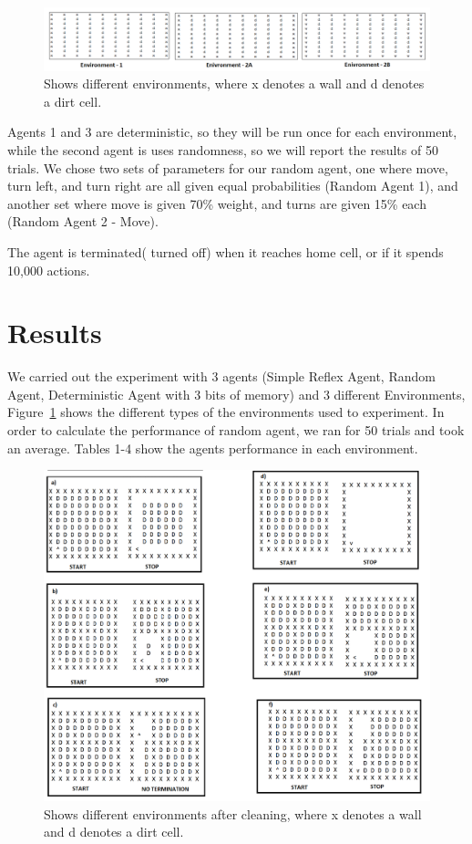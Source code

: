 \documentclass{article}
\begin{document}
\begin{figure}[h!]
\centering
\includegraphics[width=1\linewidth]{different_evirnoments.png}
\caption{Shows different environments, where x denotes a wall and d denotes a dirt cell.}
\label{fig:environments}
\end{figure}

Agents 1 and 3 are deterministic, so they will be run once for each environment, while the second agent is uses randomness, so we will report the results of 50 trials.  We chose two sets of parameters for our random agent, one where move, turn left, and turn right are all given equal probabilities (Random Agent 1), and another set where move is given 70\% weight, and turns are given 15\% each (Random Agent 2 - Move).

The agent is terminated( turned off) when it reaches home cell, or if it spends 10,000 actions.



\section{Results}
We carried out the experiment with 3 agents (Simple Reflex Agent, Random Agent, Deterministic Agent with 3 bits of memory) and 3 different Environments, Figure~\ref{fig:environments} shows the different types of the environments used to experiment.    In order to calculate the performance of random agent, we ran for 50 trials and took an average. Tables 1-4 show the agents performance in each environment.  

\begin{figure}[h!]
\centering
\includegraphics[width=1\linewidth]{all_in_one}
\caption{Shows different environments after cleaning, where x denotes a wall and d denotes a dirt cell.}
\label{fig:cleaned}
\end{figure}
\end{document}
